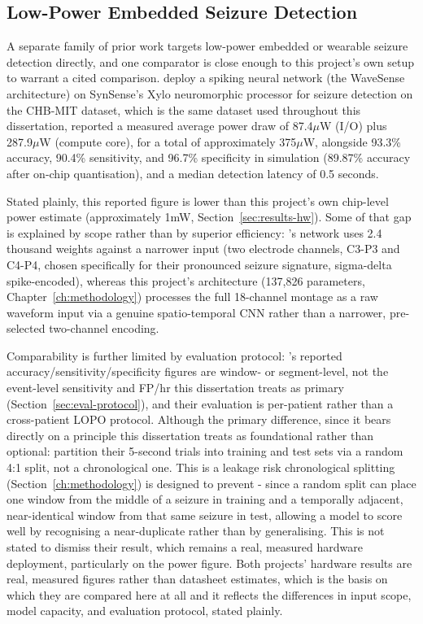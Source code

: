 \subsection{Low-Power Embedded Seizure Detection}

A separate family of prior work targets low-power embedded or wearable seizure detection directly, and one comparator is close enough to this project's own setup to warrant a 
cited comparison. \citet{li2024xylo} deploy a spiking neural network (the WaveSense architecture) on SynSense's Xylo neuromorphic 
processor for seizure detection on the CHB-MIT dataset, which is the same dataset used throughout this dissertation, reported a measured average power draw of 87.4$\mu$W (I/O) plus 
287.9$\mu$W (compute core), for a total of approximately 375$\mu$W, alongside 93.3\% accuracy, 90.4\% sensitivity, and 96.7\% specificity in simulation (89.87\% accuracy after 
on-chip quantisation), and a median detection latency of 0.5 seconds.

Stated plainly, this reported figure is lower than this project's own chip-level power 
estimate (approximately 1mW, Section~\ref{sec:results-hw}). Some of that gap is explained by scope rather than by superior efficiency: \citet{li2024xylo}'s network uses 2.4 
thousand weights against a narrower input (two electrode channels, C3-P3 and C4-P4, chosen specifically for their pronounced seizure signature, sigma-delta spike-encoded),
whereas this project's architecture (137,826 parameters, Chapter~\ref{ch:methodology}) processes the full 18-channel montage as a raw waveform input via a genuine spatio-temporal CNN 
rather than a narrower, pre-selected two-channel encoding. 

Comparability is further limited by evaluation protocol: \citeauthor{li2024xylo}'s reported accuracy/sensitivity/specificity 
figures are window- or segment-level, not the event-level sensitivity and FP/hr this dissertation treats as primary (Section~\ref{sec:eval-protocol}), and their evaluation is 
per-patient rather than a cross-patient LOPO protocol. Although the primary difference, since it bears directly on a principle this 
dissertation treats as foundational rather than optional: \citeauthor{li2024xylo} partition their 5-second trials into training and test sets via a random 4:1 split, not a 
chronological one. This is a leakage risk chronological splitting (Section~\ref{ch:methodology}) is designed to prevent - since a random split can place one window from 
the middle of a seizure in training and a temporally adjacent, near-identical window from that same seizure in test, allowing a model to score well by recognising a near-duplicate 
rather than by generalising. This is not stated to dismiss their result, which remains a real, measured hardware deployment, particularly on the 
power figure. Both projects' hardware results 
are real, measured figures rather than datasheet estimates, which is the basis on which they are compared here at all and it reflects the differences in input scope, model capacity, and evaluation protocol, stated plainly.

